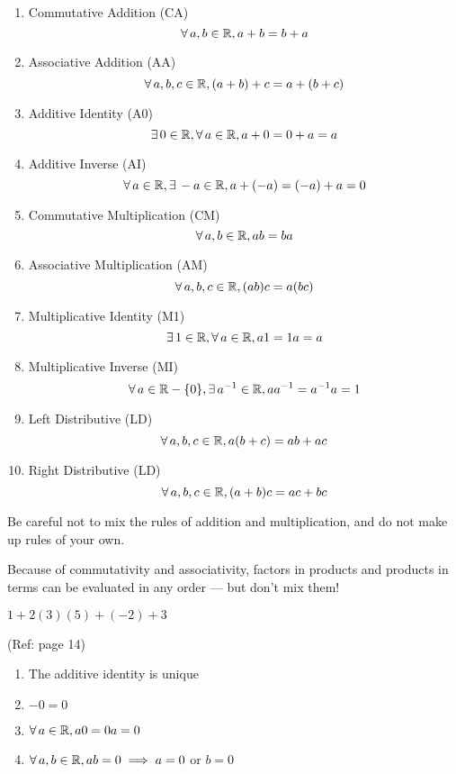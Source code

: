 \documentclass[letterpaper,12pt,fleqn]{article}
\begin{document}
\begin{properties}
  \listbreak
  \begin{enumerate}
  \item Commutative Addition (CA)
    \[\forall\,a,b\in\mathbb{R},a+b=b+a\]
  \item Associative Addition (AA)
    \[\forall\,a,b,c\in\mathbb{R},(a+b)+c=a+(b+c)\]
  \item Additive Identity (A0)
    \[\exists\,0\in\mathbb{R},\forall\,a\in\mathbb{R},a+0=0+a=a\]
  \item Additive Inverse (AI)
    \[\forall\,a\in\mathbb{R},\exists\,-a\in\mathbb{R},a+(-a)=(-a)+a=0\]
  \item Commutative Multiplication (CM)
    \[\forall\,a,b\in\mathbb{R},ab=ba\]
  \item Associative Multiplication (AM)
    \[\forall\,a,b,c\in\mathbb{R},(ab)c=a(bc)\]
  \item Multiplicative Identity (M1)
    \[\exists\,1\in\mathbb{R},\forall\,a\in\mathbb{R},a1=1a=a\]
  \item Multiplicative Inverse (MI)
    \[\forall\,a\in\mathbb{R}-\{0\},\exists\,a^{-1}\in\mathbb{R},aa^{-1}=a^{-1}a=1\]
  \item Left Distributive (LD)
    \[\forall\,a,b,c\in\mathbb{R},a(b+c)=ab+ac\]
  \item Right Distributive (LD)
    \[\forall\,a,b,c\in\mathbb{R},(a+b)c=ac+bc\]
  \end{enumerate}
\end{properties}

Be careful not to mix the rules of addition and multiplication, and do not
make up rules of your own.

Because of commutativity and associativity, factors in products and products in
terms can be evaluated in any order --- but don't mix them!

\begin{example}
  $1+2(3)(5)+(-2)+3$
\end{example}

\begin{properties}[Zero]
  (Ref: page 14)
  \begin{enumerate}
  \item The additive identity is unique
  \item $-0=0$
  \item $\forall\,a\in\mathbb{R},a0=0a=0$
  \item $\forall\,a,b\in\mathbb{R},ab=0\implies a=0$ or $b=0$
  \end{enumerate}
\end{properties}
\end{document}
